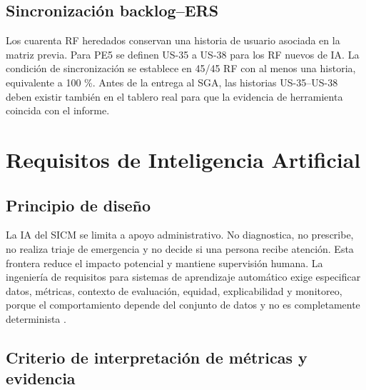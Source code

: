 \documentclass[11pt,a4paper]{article}
\begin{document}
	\subsection{Sincronización backlog--ERS}
	Los cuarenta RF heredados conservan una historia de usuario asociada en la matriz previa. Para PE5 se definen US-35 a US-38 para los RF nuevos de IA. La condición de sincronización se establece en 45/45 RF con al menos una historia, equivalente a 100 \%. Antes de la entrega al SGA, las historias US-35--US-38 deben existir también en el tablero real para que la evidencia de herramienta coincida con el informe.
	\clearpage
	
	\section{Requisitos de Inteligencia Artificial}
	\subsection{Principio de diseño}
	La IA del SICM se limita a apoyo administrativo. No diagnostica, no prescribe, no realiza triaje de emergencia y no decide si una persona recibe atención. Esta frontera reduce el impacto potencial y mantiene supervisión humana. La ingeniería de requisitos para sistemas de aprendizaje automático exige especificar datos, métricas, contexto de evaluación, equidad, explicabilidad y monitoreo, porque el comportamiento depende del conjunto de datos y no es completamente determinista \cite{vogelsang2019,ahmad2023,habibullah2023}.
	
	\subsection{Criterio de interpretación de métricas y evidencia}
	\label{subsec:umbrales-ia}
	\begin{center}
	\end{center}
	
\end{document}
